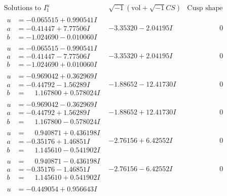 \documentclass[1p]{elsarticle_modified}
\theoremstyle{definition}
\newcommand{\I}{\sqrt{-1}}
\begin{document}
$$\begin{array}{c|c|c}  
\text{Solutions to }I^u_{1}& \I (\text{vol} + \sqrt{-1}CS) & \text{Cusp shape}\\
 \hline 
\begin{aligned}
u &= -0.065515 + 0.990541 I \\
a &= -0.41447 + 7.77506 I \\
b &= -1.024690 - 0.010060 I\end{aligned}
 & -3.35320 - 2.04195 I & \phantom{-0.000000 } 0 \\ \hline\begin{aligned}
u &= -0.065515 - 0.990541 I \\
a &= -0.41447 - 7.77506 I \\
b &= -1.024690 + 0.010060 I\end{aligned}
 & -3.35320 + 2.04195 I & \phantom{-0.000000 } 0 \\ \hline\begin{aligned}
u &= -0.969042 + 0.362969 I \\
a &= -0.44792 - 1.56289 I \\
b &= \phantom{-}1.167800 + 0.578024 I\end{aligned}
 & -1.88652 - 12.41730 I & \phantom{-0.000000 } 0 \\ \hline\begin{aligned}
u &= -0.969042 - 0.362969 I \\
a &= -0.44792 + 1.56289 I \\
b &= \phantom{-}1.167800 - 0.578024 I\end{aligned}
 & -1.88652 + 12.41730 I & \phantom{-0.000000 } 0 \\ \hline\begin{aligned}
u &= \phantom{-}0.940871 + 0.436198 I \\
a &= -0.35176 + 1.46851 I \\
b &= \phantom{-}1.145610 - 0.541902 I\end{aligned}
 & -2.76156 + 6.42552 I & \phantom{-0.000000 } 0 \\ \hline\begin{aligned}
u &= \phantom{-}0.940871 - 0.436198 I \\
a &= -0.35176 - 1.46851 I \\
b &= \phantom{-}1.145610 + 0.541902 I\end{aligned}
 & -2.76156 - 6.42552 I & \phantom{-0.000000 } 0 \\ \hline\begin{aligned}
u &= -0.449054 + 0.956643 I \\

\end{aligned}
\end{array}$$
\end{document}
